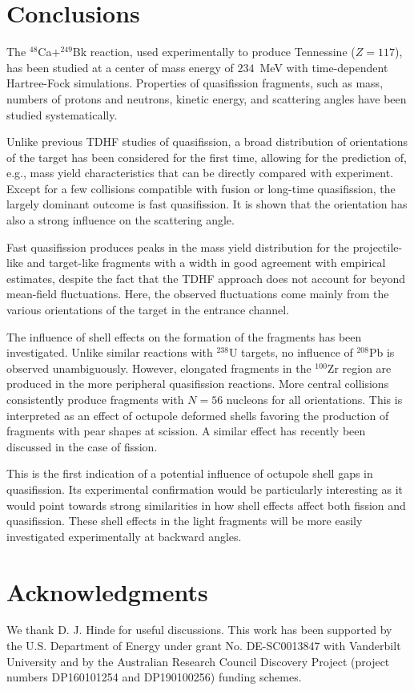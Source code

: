 \section{Conclusions}\label{cabk:sec:conclusion}

The $^{48}$Ca$+^{249}$Bk reaction, used experimentally to produce Tennessine ($Z=117$), has been studied at a center of mass energy of $234$~MeV with time-dependent Hartree-Fock simulations.
Properties of quasifission fragments, such as mass, numbers of protons and neutrons, kinetic energy, and scattering angles have been studied systematically.

Unlike previous TDHF studies of quasifission, a broad distribution of orientations of the target has been considered for the first time, allowing for the prediction of, e.g.,  mass yield characteristics that can be directly compared with experiment.
Except for a few collisions compatible with fusion or long-time quasifission, the largely dominant outcome is fast quasifission.
It is shown that the orientation has also a strong influence on the scattering angle.

Fast quasifission produces peaks in the mass yield distribution for the projectile-like and target-like fragments with a width in good agreement with empirical estimates, despite the fact that the TDHF approach does not account for beyond mean-field fluctuations.
Here, the observed fluctuations come mainly from the various orientations of the target in the entrance channel.

The influence of shell effects on the formation of the fragments has been investigated.
Unlike similar reactions with $^{238}$U targets, no influence of $^{208}$Pb is observed unambiguously.
However, elongated fragments in the $^{100}$Zr region are produced in the more peripheral quasifission reactions.
More central collisions consistently produce fragments with $N=56$ nucleons for all orientations.
This is interpreted as an effect of octupole deformed shells favoring the production of fragments with pear shapes at scission.
A similar effect has recently been discussed in the case of fission.

This is the first indication of a potential influence of octupole shell gaps in quasifission.
Its experimental confirmation would be particularly interesting as it would point towards strong similarities in how shell effects affect both fission and quasifission.
These shell effects in the light fragments will be more easily investigated experimentally at backward angles.


\section{Acknowledgments}
	We thank D. J. Hinde for useful discussions.
	This work has been supported by the U.S. Department of Energy under grant No.
	DE-SC0013847 with Vanderbilt University and by the
	Australian Research Council Discovery Project (project numbers DP160101254 and DP190100256) funding schemes.


\clearpage

